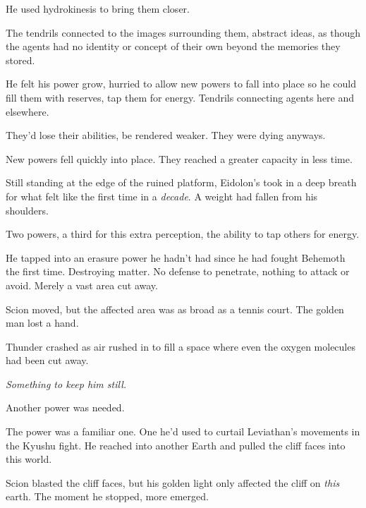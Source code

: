 He used hydrokinesis to bring them closer.



The tendrils connected to the images surrounding them, abstract ideas, as though the agents had no identity or concept of their own beyond the memories they stored.



He felt his power grow, hurried to allow new powers to fall into place so he could fill them with reserves, tap them for energy.  Tendrils connecting agents here and elsewhere.



They'd lose their abilities, be rendered weaker.  They were dying anyways.



New powers fell quickly into place.  They reached a greater capacity in less time.



Still standing at the edge of the ruined platform, Eidolon's took in a deep breath for what felt like the first time in a \emph{decade}.  A weight had fallen from his shoulders.



Two powers, a third for this extra perception, the ability to tap others for energy.



He tapped into an erasure power he hadn't had since he had fought Behemoth the first time.  Destroying matter.  No defense to penetrate, nothing to attack or avoid.  Merely a vast area cut away.



Scion moved, but the affected area was as broad as a tennis court.  The golden man lost a hand.



Thunder crashed as air rushed in to fill a space where even the oxygen molecules had been cut away.



\emph{Something to keep him still.}



Another power was needed.



The power was a familiar one.  One he'd used to curtail Leviathan's movements in the Kyushu fight.  He reached into another Earth and pulled the cliff faces into this world.



Scion blasted the cliff faces, but his golden light only affected the cliff on \emph{this} earth.  The moment he stopped, more emerged.



